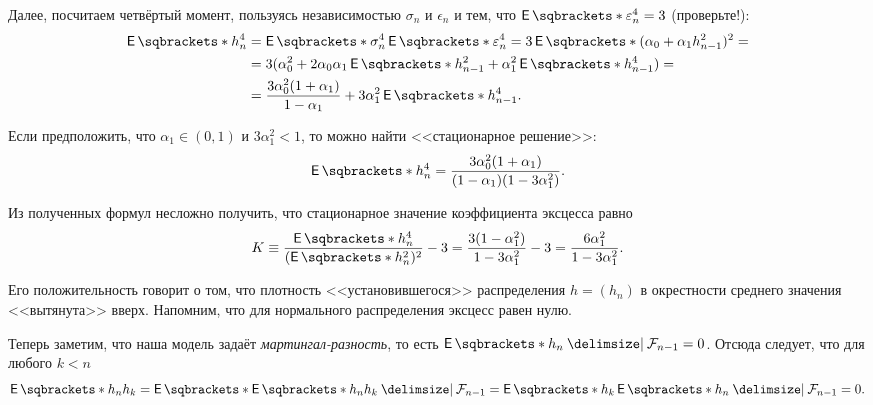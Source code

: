 Далее, посчитаем четвёртый момент, пользуясь независимостью \(\sigma_{n}\) и 
\(\epsilon_{n}\) и тем, что \(\E{\epsilon_{n}^{4}} = 3\) (проверьте!):
\begin{align*}
	\E{h_{n}^{4}} &= \E{\sigma_{n}^{4}}\E{\epsilon_{n}^{4}} = 3\E{(\alpha_{0} + 
	\alpha_{1}h_{n - 1}^{2})^{2}} = \\
	&= 3(\alpha_{0}^{2} + 2\alpha_{0}\alpha_{1}\E{h_{n - 1}^{2}} + 
	\alpha_{1}^{2}\E{h_{n - 1}^{4}}) = \\
	&= \frac{3\alpha_{0}^{2}(1 + \alpha_{1})}{1 - \alpha_{1}} + 
	3\alpha_{1}^{2}\E{h_{n - 1}^{4}}.
\end{align*}

Если предположить, что \(\alpha_{1} \in (0, 1)\) и \(3\alpha_{1}^{2} < 1\), то 
можно найти <<стационарное решение>>:
\[
	\E{h_{n}^{4}} = \frac{3\alpha_{0}^{2}(1 + \alpha_{1})}{(1 - \alpha_{1})(1 - 
	3\alpha_{1}^{2})}.
\]

Из полученных формул несложно получить, что стационарное значение коэффициента 
эксцесса равно
\[
	K \equiv \frac{\E{h_{n}^{4}}}{(\E{h_{n}^{2}})^{2}} - 3 = \frac{3(1 - 
	\alpha_{1}^{2})}{1 - 3\alpha_{1}^{2}} - 3 = \frac{6\alpha_{1}^{2}}{1 - 
	3\alpha_{1}^{2}}.
\]

Его положительность говорит о том, что плотность <<установившегося>> 
распределения \(h = (h_{n})\) в окрестности среднего значения <<вытянута>> 
вверх. Напомним, что для нормального распределения эксцесс равен нулю.

Теперь заметим, что наша модель задаёт \emph{мартингал-разность}, то есть 
\(\E{h_{n} \given \F_{n - 1}} = 0\). Отсюда следует, что для любого \(k < n\)
\[
	\E{h_{n}h_{k}} = \E{\E{h_{n}h_{k} \given \F_{n - 1}}} = \E{h_{k}\E{h_{n} 
	\given \F_{n - 1}}} = 0.
\]


